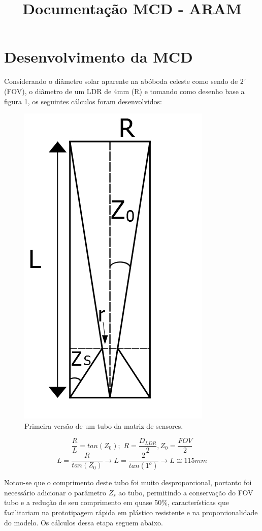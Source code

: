 \documentclass[a4paper,12pt]{article}
\title{Documentação MCD - ARAM}
\begin{document}
	\maketitle
	\section{Desenvolvimento da MCD}
	Considerando o diâmetro solar aparente na abóboda celeste como sendo de $2^{\circ}$ (FOV), o diâmetro de um LDR de 4mm (R) e tomando como desenho base a figura 1, os seguintes cálculos foram desenvolvidos: 

\begin{figure}[htb] 
	\centering
	\includegraphics[scale=0.5]{MCD_1.jpg}
	\caption{Primeira versão de um tubo da matriz de sensores.}
\end{figure}

$$\frac{R}{L} = tan(Z_{0}) ; \,\,   R = \frac{D_{LDR}}{2}, Z_{0} = \frac{FOV}{2}$$
$$L = \frac{R}{tan(Z_{0})} \longrightarrow L = \frac{2}{tan(1^{o})}  \longrightarrow L \cong 115 mm$$ 


Notou-se que o comprimento deste tubo foi muito desproporcional, portanto foi necessário adicionar o parâmetro $Z_{s}$ ao tubo, permitindo a conservação do FOV tubo e a redução de seu comprimento em quase 50\%, características que facilitariam na prototipagem rápida em plástico resistente e na proporcionalidade do modelo. Os cálculos dessa etapa seguem abaixo.
\end{document}
